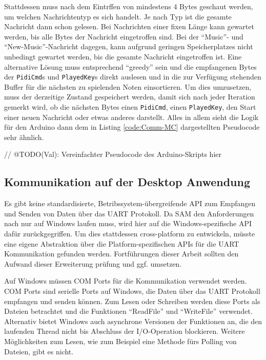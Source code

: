 Stattdessen muss nach dem Eintrffen von mindestens 4 Bytes geschaut werden, um welchen Nachrichtentyp es sich handelt.
Je nach Typ ist die gesamte Nachricht dann schon gelesen.
Bei Nachrichten einer fixen Länge kann gewartet werden, bis alle Bytes der Nachricht eingetroffen sind.
Bei der \enquote{Music}- und \enquote{New-Music}-Nachricht dagegen, kann aufgrund geringen Speicherplatzes nicht unbedingt gewartet werden, bis die gesamte Nachricht eingetroffen ist.
Eine alternative Lösung muss entsprechend \enquote{greedy} sein und die empfangenen Bytes der \lstinline|PidiCmd|s und \lstinline|PlayedKey|s direkt auslesen und in die zur Verfügung stehenden Buffer für die nächsten zu spielenden Noten einsortieren.
Um dies umzusetzen, muss der derzeitige Zustand gespeichert werden, damit sich nach jeder Iteration gemerkt wird, ob die nächsten Bytes einen \lstinline|PidiCmd|, einen \lstinline|PlayedKey|, den Start einer neuen Nachricht oder etwas anderes darstellt.
Alles in allem sieht die Logik für den Arduino dann dem in Listing \ref{code:Comm-MC} dargestellten Pseudocode sehr ähnlich. %

\begin{UnbrokenCodePage}[style=CStyle, caption={Kommunikation beim \ac{MC}}, label={code:Comm-MC}]
// @TODO(Val): Vereinfachter Pseudocode des Arduino-Skripts hier
\end{UnbrokenCodePage}


\subsection{Kommunikation auf der Desktop Anwendung} \label{umsetzungSW-Kommunikation-UI}

Es gibt keine standardisierte, Betribssystem-übergreifende API zum Empfangen und Senden von Daten über das \ac{UART} Protokoll.
Da \ac{SAM} den Anforderungen nach nur auf Windows laufen muss, wird hier auf die Windows-spezifische API dafür zurückgegriffen.
Um dies stattdessen cross-platform zu entwickeln, müsste eine eigene Abstraktion über die Platform-spezifischen APIs für die \ac{UART} Kommunikation gefunden werden.
Fortführungen dieser Arbeit sollten den Aufwand dieser Erweiterung prüfung und ggf. umsetzen.

Auf Windows müssen COM Ports für die Kommunikation verwendet werden.
COM Ports sind serielle Ports auf Windows, die Daten über das \ac{UART} Protokoll empfangen und senden können.
Zum Lesen oder Schreiben werden diese Ports als Dateien betrachtet und die Funktionen \enquote{ReadFile} und \enquote{WriteFile} verwendet.
Alternativ bietet Windows auch asynchrone Versionen der Funktionen an, die den laufenden Thread nicht bis Abschluss der \ac{I/O}-Operation blockieren.
Weitere Möglichkeiten zum Lesen, wie zum Beispiel eine Methode fürs Polling von Dateien, gibt es nicht. %

